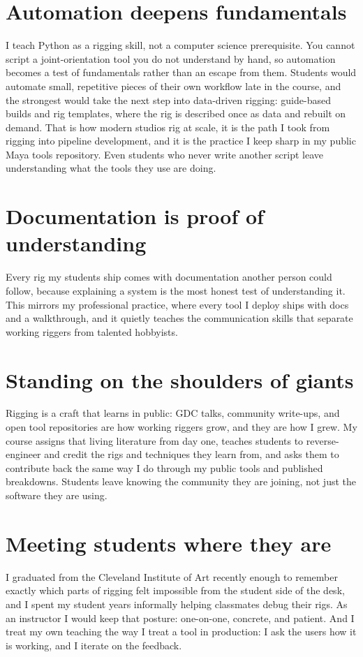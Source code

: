 \documentclass[10pt,a4paper]{article}
\begin{document}
\section{Automation deepens fundamentals}
I teach Python as a rigging skill, not a computer science prerequisite. You cannot script a joint-orientation tool you do not understand by hand, so automation becomes a test of fundamentals rather than an escape from them. Students would automate small, repetitive pieces of their own workflow late in the course, and the strongest would take the next step into data-driven rigging: guide-based builds and rig templates, where the rig is described once as data and rebuilt on demand. That is how modern studios rig at scale, it is the path I took from rigging into pipeline development, and it is the practice I keep sharp in my public Maya tools repository. Even students who never write another script leave understanding what the tools they use are doing.

\section{Documentation is proof of understanding}
Every rig my students ship comes with documentation another person could follow, because explaining a system is the most honest test of understanding it. This mirrors my professional practice, where every tool I deploy ships with docs and a walkthrough, and it quietly teaches the communication skills that separate working riggers from talented hobbyists.

\section{Standing on the shoulders of giants}
Rigging is a craft that learns in public: GDC talks, community write-ups, and open tool repositories are how working riggers grow, and they are how I grew. My course assigns that living literature from day one, teaches students to reverse-engineer and credit the rigs and techniques they learn from, and asks them to contribute back the same way I do through my public tools and published breakdowns. Students leave knowing the community they are joining, not just the software they are using.

\section{Meeting students where they are}
I graduated from the Cleveland Institute of Art recently enough to remember exactly which parts of rigging felt impossible from the student side of the desk, and I spent my student years informally helping classmates debug their rigs. As an instructor I would keep that posture: one-on-one, concrete, and patient. And I treat my own teaching the way I treat a tool in production: I ask the users how it is working, and I iterate on the feedback.
\end{document}
